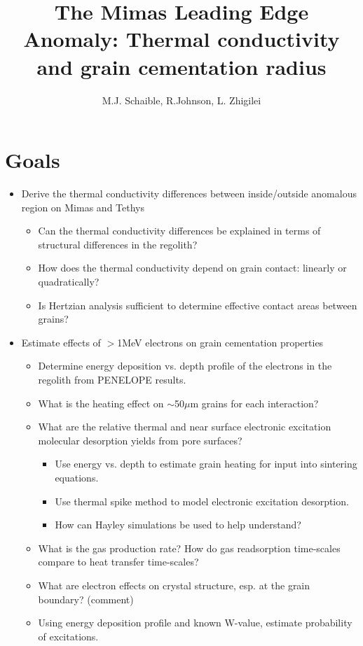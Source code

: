 \documentclass[11pt]{article} %
\title{The Mimas Leading Edge Anomaly: Thermal conductivity and grain cementation radius}
\author{M.J. Schaible, R.Johnson, L. Zhigilei}
\begin{document}
\maketitle

\section{Goals}

	\begin{itemize}
	\item Derive the thermal conductivity differences between inside/outside anomalous region on Mimas and Tethys
		\begin{itemize}
		\item Can the thermal conductivity differences be explained in terms of structural differences in the regolith?
		\item How does the thermal conductivity depend on grain contact: linearly or quadratically?
		\item Is Hertzian analysis sufficient to determine effective contact areas between grains?
		\end{itemize}
	\item Estimate effects of $>$1MeV electrons on grain cementation properties
		\begin{itemize}
		\item Determine energy deposition vs. depth profile of the electrons in the regolith from PENELOPE results.
		\item What is the heating effect on $\sim$50$\mu$m grains for each interaction?
		\item What are the relative thermal and near surface electronic excitation molecular desorption yields from pore surfaces?
			\begin{itemize}
			\item Use energy vs. depth to estimate grain heating for input into sintering equations. 
			\item Use thermal spike method to model electronic excitation desorption.
			\item How can Hayley simulations be used to help understand?
			\end{itemize}
		\item What is the gas production rate? How do gas readsorption time-scales compare to heat transfer time-scales?
		\item What are electron effects on crystal structure, esp. at the grain boundary? (comment)
		\item Using energy deposition profile and known W-value, estimate probability of excitations.

\end{itemize}
\end{itemize}
\end{document}
